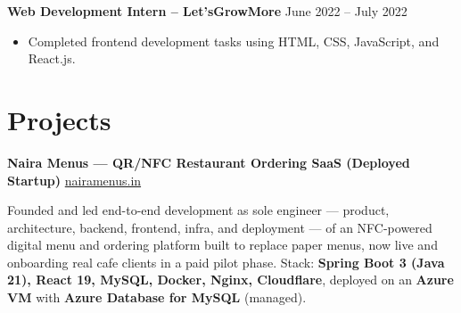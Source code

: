 \documentclass[10pt]{article}
\begin{document}
\textbf{Web Development Intern -- Let'sGrowMore} \hfill June 2022 -- July 2022
\begin{itemize}[leftmargin=*, itemsep=2pt]
\item Completed frontend development tasks using HTML, CSS, JavaScript, and React.js.
\end{itemize}

\section*{Projects}

\textbf{Naira Menus — QR/NFC Restaurant Ordering SaaS (Deployed Startup)} \hfill \href{https://nairamenus.in}{nairamenus.in}

Founded and led end-to-end development as sole engineer — product, architecture, backend, frontend, infra, and deployment — of an NFC-powered digital menu and ordering platform built to replace paper menus, now live and onboarding real cafe clients in a paid pilot phase. Stack: \textbf{Spring Boot 3 (Java 21), React 19, MySQL, Docker, Nginx, Cloudflare}, deployed on an \textbf{Azure VM} with \textbf{Azure Database for MySQL} (managed).
\end{document}
